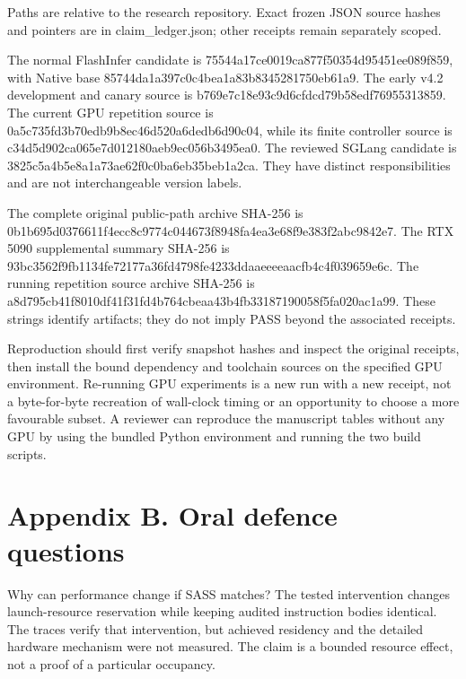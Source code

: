 \documentclass[11pt,a4paper]{article}
\begin{document}
\noindent\small Paths are relative to the research repository. Exact frozen JSON source hashes and pointers are in claim\_ledger.json; other receipts remain separately scoped.\normalsize\par\medskip

The normal FlashInfer candidate is 75544a17ce0019ca877f50354d95451ee089f859, with Native base 85744da1a397c0c4bea1a83b8345281750eb61a9. The early v4.2 development and canary source is b769e7c18e93c9d6cfdcd79b58edf76955313859. The current GPU repetition source is 0a5c735fd3b70edb9b8ec46d520a6dedb6d90c04, while its finite controller source is c34d5d902ca065e7d012180aeb9ec056b3495ea0. The reviewed SGLang candidate is 3825c5a4b5e8a1a73ae62f0c0ba6eb35beb1a2ca. They have distinct responsibilities and are not interchangeable version labels.


The complete original public-path archive SHA-256 is 0b1b695d0376611f4ecc8c9774c044673f8948fa4ea3e68f9e383f2abc9842e7. The RTX 5090 supplemental summary SHA-256 is 93bc3562f9fb1134fe72177a36fd4798fe4233ddaaeeeeaacfb4c4f039659e6c. The running repetition source archive SHA-256 is a8d795cb41f8010df41f31fd4b764cbeaa43b4fb33187190058f5fa020ac1a99. These strings identify artifacts; they do not imply PASS beyond the associated receipts.


Reproduction should first verify snapshot hashes and inspect the original receipts, then install the bound dependency and toolchain sources on the specified GPU environment. Re-running GPU experiments is a new run with a new receipt, not a byte-for-byte recreation of wall-clock timing or an opportunity to choose a more favourable subset. A reviewer can reproduce the manuscript tables without any GPU by using the bundled Python environment and running the two build scripts.


\clearpage

\section*{Appendix B. Oral defence questions}


Why can performance change if SASS matches? The tested intervention changes launch-resource reservation while keeping audited instruction bodies identical. The traces verify that intervention, but achieved residency and the detailed hardware mechanism were not measured. The claim is a bounded resource effect, not a proof of a particular occupancy.
\end{document}
